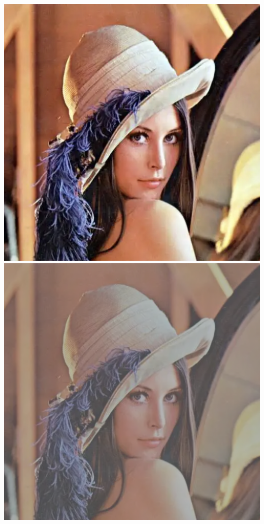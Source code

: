 \documentclass[
10pt, %
aspectratio=169, %
]{beamer}
\begin{document}
\begin{frame}
		\centering
		\includegraphics[scale=0.42]{lena.png} 
		\includegraphics[scale=0.21]{lena-con-contraste.png} 
		
	\end{frame}
	
\end{document}
